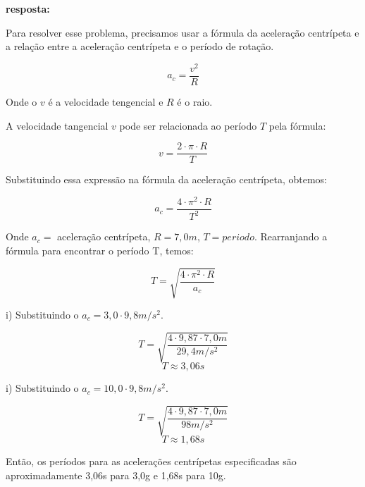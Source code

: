 \documentclass[a4paper, 12pt]{article}
\begin{document}
\begin{flushleft}
		\textbf{resposta:}
		
		Para resolver esse problema, precisamos usar a fórmula da aceleração centrípeta e a relação entre a aceleração centrípeta e o período de rotação.
		
		\begin{equation*}
			a_c = \frac{v^2}{R}
		\end{equation*}
		
		Onde o $v$ é a velocidade tengencial e $R$ é o raio.
		
		A velocidade tangencial $v$ pode ser relacionada ao período $T$ pela fórmula:
		
		\begin{equation*}
			v = \frac{2 \cdot \pi \cdot R}{T}
		\end{equation*}
		
		Substituindo essa expressão na fórmula da aceleração centrípeta, obtemos:
		
		\begin{equation*}
			a_c = \frac{4 \cdot \pi^2 \cdot R}{T^2}
		\end{equation*}
		
		Onde $a_c = $ aceleração centrípeta, $R = 7,0m$, $T = periodo$. Rearranjando a fórmula para encontrar o período T, temos:
		
		\begin{equation*}
			T = \sqrt{\frac{4 \cdot \pi^2 \cdot R}{a_c}}
		\end{equation*}
		
		i) Substituindo o $a_c = 3,0 \cdot 9,8 m/s^2$.
		
		\begin{equation*}
			T = \sqrt{\frac{4 \cdot 9,87 \cdot 7,0m}{29,4m/s^2}}
		\end{equation*}
		\begin{equation*}
			T \approx 3,06s
		\end{equation*}
		
		i) Substituindo o $a_c = 10,0 \cdot 9,8 m/s^2$.
		
		\begin{equation*}
			T = \sqrt{\frac{4 \cdot 9,87 \cdot 7,0m}{98m/s^2}}
		\end{equation*}
		\begin{equation*}
			T \approx 1,68s
		\end{equation*}
		
		Então, os períodos para as acelerações centrípetas especificadas são aproximadamente 3,06s para 3,0g e 1,68s para 10g.
		

\end{flushleft}
\end{document}
